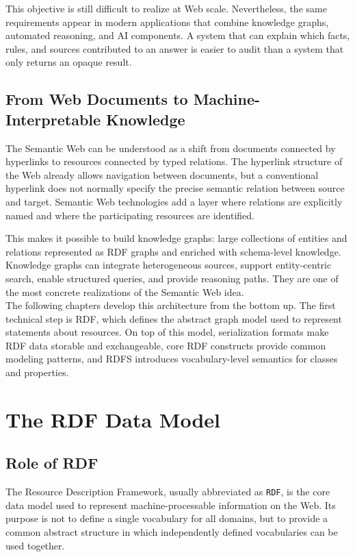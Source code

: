 \documentclass{scrbook}
\begin{document}
	This objective is still difficult to realize at Web scale. Nevertheless, the same requirements appear in modern applications that combine knowledge graphs, automated reasoning, and AI components. A system that can explain which facts, rules, and sources contributed to an answer is easier to audit than a system that only returns an opaque result.
	
	\section{From Web Documents to Machine-Interpretable Knowledge}
	
	The Semantic Web can be understood as a shift from documents connected by hyperlinks to resources connected by typed relations. The hyperlink structure of the Web already allows navigation between documents, but a conventional hyperlink does not normally specify the precise semantic relation between source and target. Semantic Web technologies add a layer where relations are explicitly named and where the participating resources are identified.
	
	This makes it possible to build knowledge graphs: large collections of entities and relations represented as RDF graphs and enriched with schema-level knowledge. Knowledge graphs can integrate heterogeneous sources, support entity-centric search, enable structured queries, and provide reasoning paths. They are one of the most concrete realizations of the Semantic Web idea.\\
	
	The following chapters develop this architecture from the bottom up. The first technical step is RDF, which defines the abstract graph model used to represent statements about resources. On top of this model, serialization formats make RDF data storable and exchangeable, core RDF constructs provide common modeling patterns, and RDFS introduces vocabulary-level semantics for classes and properties.
	
	\chapter{The RDF Data Model}
	
	\section{Role of RDF}
	
	The Resource Description Framework, usually abbreviated as \texttt{RDF}, is the core data model used to represent machine-processable information on the Web. Its purpose is not to define a single vocabulary for all domains, but to provide a common abstract structure in which independently defined vocabularies can be used together.
	
\end{document}
